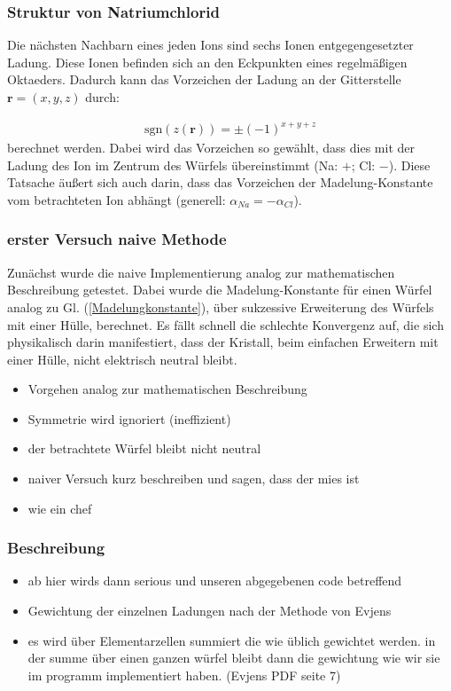 \documentclass[10pt,a4paper]{article}
\begin{document}
\subsubsection{Struktur von Natriumchlorid}

Die nächsten Nachbarn eines jeden Ions sind sechs Ionen entgegengesetzter Ladung. Diese Ionen befinden sich an den Eckpunkten eines regelmäßigen Oktaeders. Dadurch kann das Vorzeichen der Ladung an der Gitterstelle $\mathbf{r} = \left( x,y,z \right)$ durch:

\begin{align}
\mathrm{sgn}\left(z(\mathbf{r})\right) = \pm \left( -1 \right)^{x+y+z}
\end{align}
berechnet werden. Dabei wird das Vorzeichen so gewählt, dass dies mit der Ladung des Ion im Zentrum des Würfels übereinstimmt (Na: $+$; Cl: $-$). Diese Tatsache äußert sich auch darin, dass das Vorzeichen der Madelung-Konstante vom betrachteten Ion abhängt (generell: $\alpha_{Na} = - \alpha_{Cl}$).
\subsubsection{erster Versuch naive Methode}

Zunächst wurde die naive Implementierung analog zur mathematischen Beschreibung getestet. Dabei wurde die Madelung-Konstante für einen Würfel analog zu Gl. (\ref{Madelungkonstante}), über sukzessive Erweiterung des Würfels mit einer Hülle, berechnet. Es fällt schnell die schlechte Konvergenz auf, die sich physikalisch darin manifestiert, dass der Kristall, beim einfachen Erweitern mit einer Hülle, nicht elektrisch neutral bleibt.

\begin{itemize}
\item Vorgehen analog zur mathematischen Beschreibung
\item Symmetrie wird ignoriert (ineffizient)
\item der betrachtete Würfel bleibt nicht neutral
\item naiver Versuch kurz beschreiben und sagen, dass der mies ist
\item wie ein chef
\end{itemize}

\subsubsection{Beschreibung}

\begin{itemize}
\item ab hier wirds dann serious und unseren abgegebenen code betreffend
\item Gewichtung der einzelnen Ladungen nach der Methode von Evjens\cite{Evjen}
\item es wird über Elementarzellen summiert die wie üblich gewichtet werden. in der summe über einen ganzen würfel bleibt dann die gewichtung wie wir sie im programm implementiert haben. (Evjens PDF seite 7)
\end{itemize}
\end{document}

